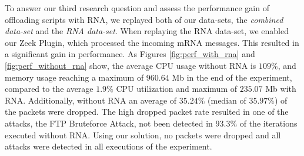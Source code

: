 To answer our third research question and assess the performance gain of offloading scripts with RNA, we replayed both of our data-sets, the \textit{combined data-set} and the \textit{RNA data-set}. When replaying the RNA data-set, we enabled our Zeek Plugin, which processed the incoming mRNA messages. This resulted in a significant gain in performance. As Figures \ref{fig:perf_with_rna} and \ref{fig:perf_without_rna} show, the average CPU usage without RNA is $109\%$, and memory usage reaching a maximum of $960.64$ Mb in the end of the experiment, compared to the average $1.9\%$ CPU utilization and maximum of $235.07$ Mb with RNA. Additionally, without RNA an average of $35.24\%$ (median of $35.97\%$) of the packets were dropped. The high dropped packet rate resulted in one of the attacks, the FTP Bruteforce Attack, not been detected in $93.3\%$ of the iterations executed without RNA. Using our solution, no packets were dropped and all attacks were detected in all executions of the experiment.







